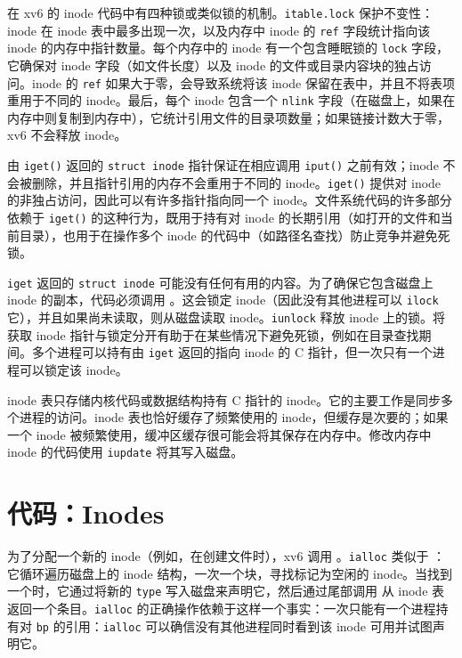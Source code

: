 在 xv6 的 inode 代码中有四种锁或类似锁的机制。\lstinline{itable.lock} 保护不变性：inode 在 inode 表中最多出现一次，以及内存中 inode 的 \lstinline{ref} 字段统计指向该 inode 的内存中指针数量。每个内存中的 inode 有一个包含睡眠锁的 \lstinline{lock} 字段，它确保对 inode 字段（如文件长度）以及 inode 的文件或目录内容块的独占访问。inode 的 \lstinline{ref} 如果大于零，会导致系统将该 inode 保留在表中，并且不将表项重用于不同的 inode。最后，每个 inode 包含一个 \lstinline{nlink} 字段（在磁盘上，如果在内存中则复制到内存中），它统计引用文件的目录项数量；如果链接计数大于零，xv6 不会释放 inode。

由 \lstinline{iget()} 返回的 \lstinline{struct inode} 指针保证在相应调用 \lstinline{iput()} 之前有效；inode 不会被删除，并且指针引用的内存不会重用于不同的 inode。\lstinline{iget()} 提供对 inode 的非独占访问，因此可以有许多指针指向同一个 inode。文件系统代码的许多部分依赖于 \lstinline{iget()} 的这种行为，既用于持有对 inode 的长期引用（如打开的文件和当前目录），也用于在操作多个 inode 的代码中（如路径名查找）防止竞争并避免死锁。

\lstinline{iget} 返回的 \lstinline{struct inode} 可能没有任何有用的内容。为了确保它包含磁盘上 inode 的副本，代码必须调用 。这会锁定 inode（因此没有其他进程可以 \lstinline{ilock} 它），并且如果尚未读取，则从磁盘读取 inode。\lstinline{iunlock} 释放 inode 上的锁。将获取 inode 指针与锁定分开有助于在某些情况下避免死锁，例如在目录查找期间。多个进程可以持有由 \lstinline{iget} 返回的指向 inode 的 C 指针，但一次只有一个进程可以锁定该 inode。

inode 表只存储内核代码或数据结构持有 C 指针的 inode。它的主要工作是同步多个进程的访问。inode 表也恰好缓存了频繁使用的 inode，但缓存是次要的；如果一个 inode 被频繁使用，缓冲区缓存很可能会将其保存在内存中。修改内存中 inode 的代码使用 \lstinline{iupdate} 将其写入磁盘。

\section{代码：Inodes}

为了分配一个新的 inode（例如，在创建文件时），xv6 调用 。\lstinline{ialloc} 类似于 ：它循环遍历磁盘上的 inode 结构，一次一个块，寻找标记为空闲的 inode。当找到一个时，它通过将新的 \lstinline{type} 写入磁盘来声明它，然后通过尾部调用  从 inode 表返回一个条目。\lstinline{ialloc} 的正确操作依赖于这样一个事实：一次只能有一个进程持有对 \lstinline{bp} 的引用：\lstinline{ialloc} 可以确信没有其他进程同时看到该 inode 可用并试图声明它。


